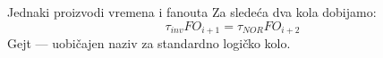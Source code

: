 \begin{frame}[label=09_3-s042]{Jednaki proizvodi vremena i fanouta}
Za sledeća dva kola dobijamo:
\[\tau_{inv}FO_{i+1}=\tau_{NOR}FO_{i+2}\]
\bigskip Gejt — uobičajen naziv za standardno logičko kolo.
\end{frame}
